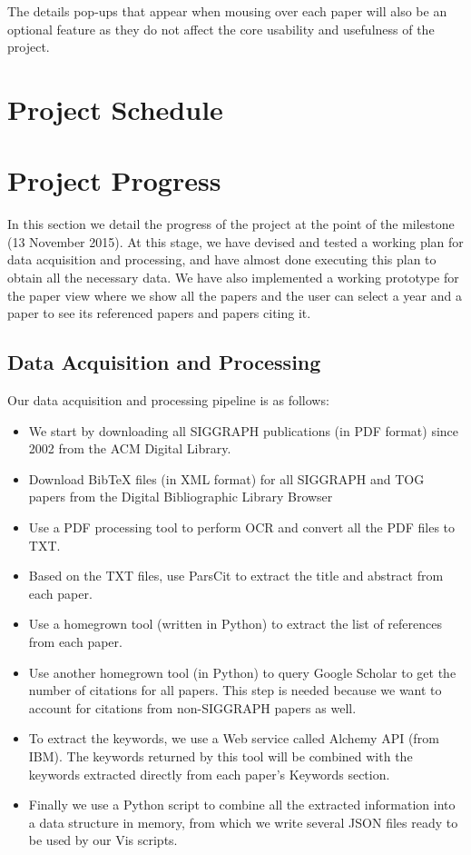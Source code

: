 \documentclass[12pt]{article}
\begin{document}
The details pop-ups that appear when mousing over each paper will also be an optional feature as they do not affect the core usability and usefulness of the project.

\section{Project Schedule}


\section{Project Progress}
In this section we detail the progress of the project at the point of the milestone (13 November 2015). At this stage, we have devised and tested a working plan for data acquisition and processing, and have almost done executing this plan to obtain all the necessary data. We have also implemented a working prototype for the paper view where we show all the papers and the user can select a year and a paper to see its referenced papers and papers citing it.
\subsection{Data Acquisition and Processing}
Our data acquisition and processing pipeline is as follows:
\begin{itemize}
    \item We start by downloading all SIGGRAPH publications (in PDF format) since 2002 from the ACM Digital Library. 
    \item Download BibTeX files (in XML format) for all SIGGRAPH and TOG papers from the Digital Bibliographic Library Browser
    \item Use a PDF processing tool to perform OCR and convert all the PDF files to TXT.
    \item Based on the TXT files, use ParsCit to extract the title and abstract from each paper.
    \item Use a homegrown tool (written in Python) to extract the list of references from each paper.
    \item Use another homegrown tool (in Python) to query Google Scholar to get the number of citations for all papers. This step is needed because we want to account for citations from non-SIGGRAPH papers as well.
    \item To extract the keywords, we use a Web service called Alchemy API (from IBM). The keywords returned by this tool will be combined with the keywords extracted directly from each paper's Keywords section.
    \item Finally we use a Python script to combine all the extracted information into a data structure in memory, from which we write several JSON files ready to be used by our Vis scripts.
\end{itemize}
\end{document}
